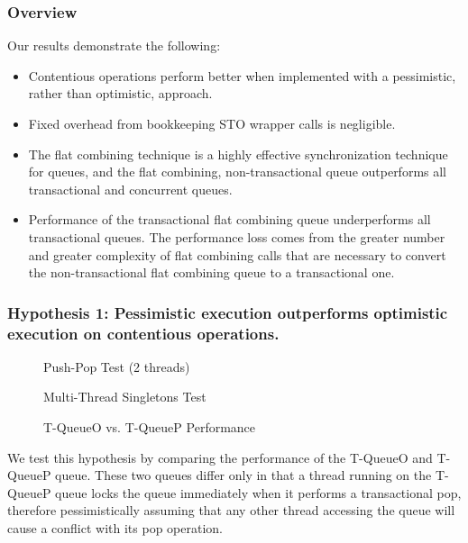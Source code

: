 \subsubsection{Overview}
Our results demonstrate the following:
\begin{itemize}
    \item Contentious operations perform better when implemented with a pessimistic, rather than optimistic, approach.
    \item Fixed overhead from bookkeeping STO wrapper calls is negligible.
    \item The flat combining technique is a highly effective synchronization technique for queues, and the flat combining, non-transactional queue outperforms all transactional and concurrent queues.
    \item Performance of the transactional flat combining queue underperforms all transactional queues. The performance loss comes from the greater number and greater complexity of flat combining calls that are necessary to convert the non-transactional flat combining queue to a transactional one.
\end{itemize}


\subsubsection{Hypothesis 1: Pessimistic execution outperforms optimistic execution on contentious operations.}
\begin{figure}[H]
    \centering
	\begin{minipage}{0.75\textwidth}
        \caption*{Push-Pop Test (2 threads)}
        \vspace{12pt}
	\end{minipage}
	\begin{minipage}{0.75\textwidth}
        \caption*{Multi-Thread Singletons Test}
	\end{minipage}
    \caption{T-QueueO vs. T-QueueP Performance}
    \label{fig:stoqs}
\end{figure}


We test this hypothesis by comparing the performance of the T-QueueO and T-QueueP queue. These two queues differ only in that a thread running on the T-QueueP queue locks the queue immediately when it performs a transactional pop, therefore pessimistically assuming that any other thread accessing the queue will cause a conflict with its pop operation.

